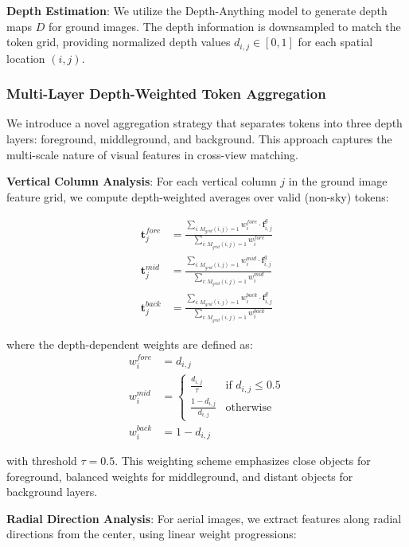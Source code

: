 \textbf{Depth Estimation}: We utilize the Depth-Anything model to generate depth maps $D$ for ground images. The depth information is downsampled to match the token grid, providing normalized depth values $d_{i,j} \in [0,1]$ for each spatial location $(i,j)$.

\subsubsection{Multi-Layer Depth-Weighted Token Aggregation}

We introduce a novel aggregation strategy that separates tokens into three depth layers: foreground, middleground, and background. This approach captures the multi-scale nature of visual features in cross-view matching.

\textbf{Vertical Column Analysis}: For each vertical column $j$ in the ground image feature grid, we compute depth-weighted averages over valid (non-sky) tokens:

\begin{align}
\mathbf{t}_j^{fore} &= \frac{\sum_{i: M_{grid}(i,j)=1} w_i^{fore} \cdot \mathbf{f}_{i,j}^g}{\sum_{i: M_{grid}(i,j)=1} w_i^{fore}} \\
\mathbf{t}_j^{mid} &= \frac{\sum_{i: M_{grid}(i,j)=1} w_i^{mid} \cdot \mathbf{f}_{i,j}^g}{\sum_{i: M_{grid}(i,j)=1} w_i^{mid}} \\
\mathbf{t}_j^{back} &= \frac{\sum_{i: M_{grid}(i,j)=1} w_i^{back} \cdot \mathbf{f}_{i,j}^g}{\sum_{i: M_{grid}(i,j)=1} w_i^{back}}
\end{align}

where the depth-dependent weights are defined as:
\begin{align}
w_i^{fore} &= d_{i,j} \\
w_i^{mid} &= \begin{cases} 
\frac{d_{i,j}}{\tau} & \text{if } d_{i,j} \leq 0.5 \\
\frac{1-d_{i,j}}{d_{i,j}} & \text{otherwise}
\end{cases} \\
w_i^{back} &= 1 - d_{i,j}
\end{align}

with threshold $\tau = 0.5$. This weighting scheme emphasizes close objects for foreground, balanced weights for middleground, and distant objects for background layers.

\textbf{Radial Direction Analysis}: For aerial images, we extract features along radial directions from the center, using linear weight progressions:

